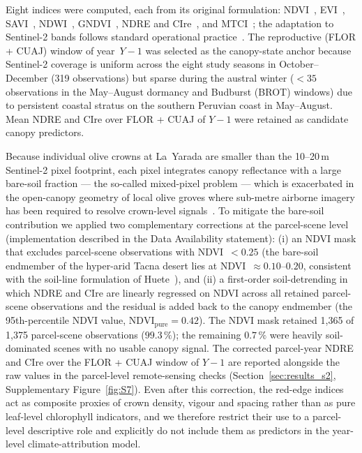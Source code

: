 \documentclass[agronomy,article,submit,pdftex,moreauthors]{Definitions/mdpi}
\begin{document}
Eight indices were computed, each from its original formulation: NDVI~\cite{tucker1979}, EVI~\cite{huete2002evi}, SAVI~\cite{huete1988savi}, NDWI~\cite{gao1996ndwi}, GNDVI~\cite{gitelson1996gndvi}, NDRE and CIre~\cite{gitelson2003cire}, and MTCI~\cite{dashcurran2004mtci}; the adaptation to Sentinel-2 bands follows standard operational practice~\cite{drusch2012,leolini2022,wu2023rs}. The reproductive (FLOR + CUAJ) window of year~$Y-1$ was selected as the canopy-state anchor because Sentinel-2 coverage is uniform across the eight study seasons in October--December (319 observations) but sparse during the austral winter ($<35$ observations in the May--August dormancy and Budburst (BROT) windows) due to persistent coastal stratus on the southern Peruvian coast in May--August. Mean NDRE and CIre over FLOR + CUAJ of $Y-1$ were retained as candidate canopy predictors.

Because individual olive crowns at La~Yarada are smaller than the 10--20\,m Sentinel-2 pixel footprint, each pixel integrates canopy reflectance with a large bare-soil fraction --- the so-called mixed-pixel problem --- which is exacerbated in the open-canopy geometry of local olive groves where sub-metre airborne imagery has been required to resolve crown-level signals~\cite{machaca2022olive}. To mitigate the bare-soil contribution we applied two complementary corrections at the parcel-scene level (implementation described in the Data Availability statement): (i) an NDVI mask that excludes parcel-scene observations with NDVI~$<0.25$ (the bare-soil endmember of the hyper-arid Tacna desert lies at NDVI~$\approx 0.10$--$0.20$, consistent with the soil-line formulation of Huete~\cite{huete1988savi}), and (ii) a first-order soil-detrending in which NDRE and CIre are linearly regressed on NDVI across all retained parcel-scene observations and the residual is added back to the canopy endmember (the 95th-percentile NDVI value, $\text{NDVI}_{\text{pure}}=0.42$). The NDVI mask retained 1{,}365 of 1{,}375 parcel-scene observations ($99.3\,\%$); the remaining $0.7\,\%$ were heavily soil-dominated scenes with no usable canopy signal. The corrected parcel-year NDRE and CIre over the FLOR + CUAJ window of $Y-1$ are reported alongside the raw values in the parcel-level remote-sensing checks (Section~\ref{sec:results_s2}, Supplementary Figure~\ref{fig:S7}). Even after this correction, the red-edge indices act as composite proxies of crown density, vigour and spacing rather than as pure leaf-level chlorophyll indicators, and we therefore restrict their use to a parcel-level descriptive role and explicitly do not include them as predictors in the year-level climate-attribution model.
\end{document}
